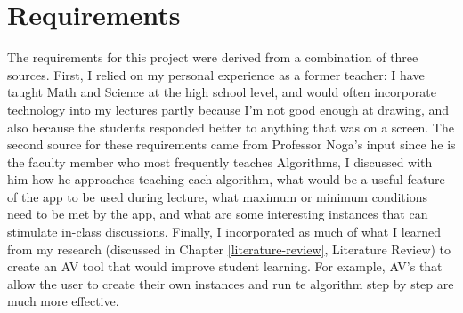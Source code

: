 \chapter{Requirements} 
\label{analysis-and-requirements}
The requirements for this project were derived from a combination of three sources. 
First, I relied on my personal experience as a former teacher: 
I have taught Math and Science at the high school level, 
and would often incorporate technology into my lectures 
partly because I'm not good enough at drawing, 
and also because the students responded better to anything that was on a screen. 
\newline\newline
The second source for these requirements came from Professor Noga's input
since he is the faculty member who most frequently teaches Algorithms, 
I discussed with him how he approaches teaching each algorithm, what would be a 
useful feature of the app to be used during lecture, 
what maximum or minimum conditions need to be met by the app, and
what are some interesting instances that can stimulate in-class discussions. 
\newline\newline
Finally, I incorporated as much of what I learned from my research
(discussed in Chapter \ref{literature-review}, Literature Review)
to create an AV tool that would improve student learning. 
For example, AV's that allow the user to create their own instances 
and run te algorithm step by step are much more effective. 
